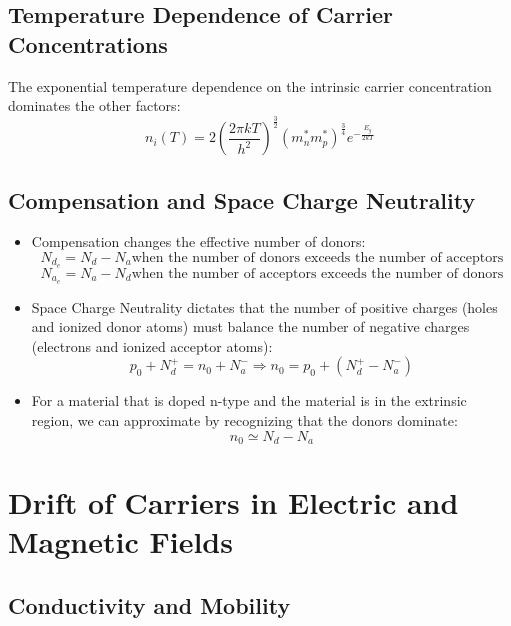 \documentclass{article}
\begin{document}
\subsection{Temperature Dependence of Carrier Concentrations}
The exponential temperature dependence on the intrinsic carrier concentration dominates the other factors$:$
\begin{equation}n_i(T)=2(\frac{2\pi kT}{h^2})^{\frac{3}{2}} (m_n^*m_p^*)^{\frac{3}{4}}e^{-\frac{E_g}{2kT}} \end{equation}
\subsection{Compensation and Space Charge Neutrality}
\begin{itemize}
\item Compensation changes the effective number of donors$:$
  \begin{equation}N_{d_e}= N_d - N_a \text{when~the number of donors exceeds the number of acceptors}\end{equation}
  \begin{equation}N_{a_e}= N_a - N_d \text{when~the number of acceptors exceeds the number of donors}\end{equation}
\item Space Charge Neutrality dictates that the number of positive charges (holes and ionized donor atoms) must balance the number of negative charges (electrons and ionized acceptor atoms)$:$
  \begin{equation}p_0 + N_d^+ = n_0 + N_a^- \Rightarrow n_0 = p_0 + (N_d^+ - N_a^-)\end{equation}
\item For a material that is doped n-type and the material is in the extrinsic region, we can approximate by recognizing that the donors dominate$:$
\begin{equation} n_0 \simeq N_d - N_a\end{equation}
\end{itemize}

\section{Drift of Carriers in Electric and Magnetic Fields}
\subsection{Conductivity and Mobility}
\end{document}
